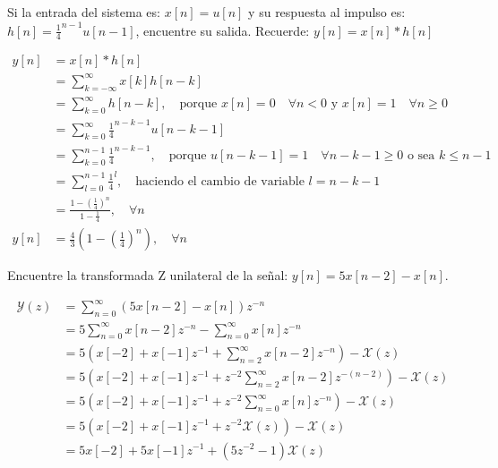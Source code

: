 \documentclass[addpoints,answers]{exam}
\begin{document}
\begin{questions}
\begin{solution}

\end{solution}

\question[5]
Si la entrada del sistema es: \(x[n] = u[n]\) y su respuesta al impulso es: \(h[n] = \frac{1}{4}^{n-1} u[n-1]\), encuentre su salida. Recuerde: \(y[n] = x[n] * h[n]\)

\begin{solution}
\[
\begin{array}{ll}
	y[n]	&= x[n] * h[n] \\
			&= \sum_{k=-\infty}^{\infty}x[k]h[n-k] \\
			&= \sum_{k=0}^{\infty}h[n-k], \quad \text{porque } x[n]=0 \quad \forall n<0 \text{ y } x[n]=1 \quad \forall n \geq 0 \\
			&= \sum_{k=0}^{\infty}\frac{1}{4}^{n-k-1} u[n-k-1] \\
			&= \sum_{k=0}^{n-1}\frac{1}{4}^{n-k-1}, \quad \text{porque } u[n-k-1]=1 \quad \forall n-k-1 \geq 0 \text{ o sea  } k \leq n-1 \\
			&= \sum_{l=0}^{n-1}\frac{1}{4}^{l}, \quad \text{haciendo el cambio de variable } l=n-k-1 \\
			&= \frac{1-\left(\frac{1}{4}\right)^n}{1-\frac{1}{4}}, \quad \forall n \\
	y[n]	&= \frac{4}{3}\left(1-\left(\frac{1}{4}\right)^n\right), \quad \forall n
\end{array}
\]
\end{solution}


\question[10]
Encuentre la transformada Z unilateral de la señal: \(y[n] = 5 x[n-2] - x[n]\).

\begin{solution}
\[
\begin{array}{ll}
	\mathscr{Y}(z)	&= \sum_{n=0}^{\infty} \left(5 x[n-2] - x[n]\right)z^{-n} \\
					&= 5 \sum_{n=0}^{\infty} x[n-2] z^{-n} - \sum_{n=0}^{\infty} x[n] z^{-n} \\
					&= 5 \left( x[-2] + x[-1] z^{-1} + \sum_{n=2}^{\infty} x[n-2] z^{-n} \right) - \mathscr{X}(z) \\
					&= 5 \left( x[-2] + x[-1] z^{-1} + z^{-2} \sum_{n=2}^{\infty} x[n-2] z^{-(n-2)} \right) - \mathscr{X}(z) \\
					&= 5 \left( x[-2] + x[-1] z^{-1} + z^{-2} \sum_{n=0}^{\infty} x[n] z^{-n} \right) - \mathscr{X}(z) \\
					&= 5 \left( x[-2] + x[-1] z^{-1} + z^{-2} \mathscr{X}(z) \right) - \mathscr{X}(z) \\
					&= 5 x[-2] + 5 x[-1] z^{-1} + \left(5 z^{-2} -1 \right) \mathscr{X}(z)
\end{array}
\]
\end{solution}


\end{questions}
\end{document}
